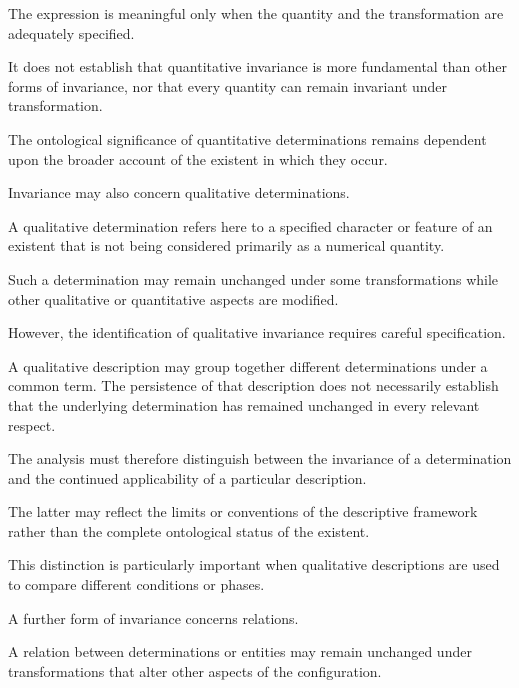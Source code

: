 The expression is meaningful only when
the quantity and the transformation
are adequately specified.

It does not establish that quantitative
invariance is more fundamental than
other forms of invariance, nor that
every quantity can remain invariant
under transformation.

The ontological significance of
quantitative determinations remains
dependent upon the broader account
of the existent in which they occur.


Invariance may also concern qualitative
determinations.

A qualitative determination refers here
to a specified character or feature
of an existent that is not being
considered primarily as a numerical
quantity.

Such a determination may remain
unchanged under some transformations
while other qualitative or quantitative
aspects are modified.

However, the identification of
qualitative invariance requires
careful specification.

A qualitative description may group
together different determinations
under a common term. The persistence
of that description does not
necessarily establish that the
underlying determination has remained
unchanged in every relevant respect.

The analysis must therefore distinguish
between the invariance of a determination
and the continued applicability of
a particular description.

The latter may reflect the limits
or conventions of the descriptive
framework rather than the complete
ontological status of the existent.

This distinction is particularly
important when qualitative descriptions
are used to compare different
conditions or phases.


A further form of invariance concerns
relations.

A relation between determinations
or entities may remain unchanged
under transformations that alter
other aspects of the configuration.


